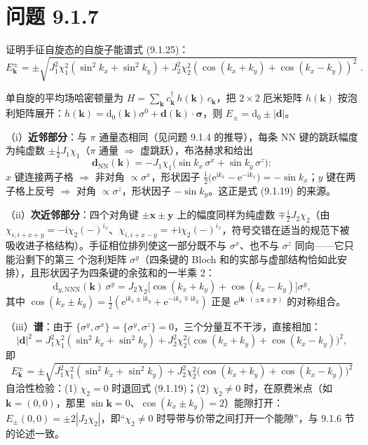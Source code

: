 \section*{问题 9.1.7}
\begin{problem}
证明手征自旋态的自旋子能谱式 (9.1.25)：
\begin{equation*}
E^{\pm}_{\pmb{k}}=\pm\sqrt{J_1^2\chi_1^2(\sin^2k_x+\sin^2k_y)+J_2^2\chi_2^2(\cos(k_x+k_y)+\cos(k_x-k_y))^2}\;.
\end{equation*}
\end{problem}
\solution
单自旋的平均场哈密顿量为 $H=\sum_{\pmb{k}}c^{\dagger}_{\pmb{k}}\,h(\pmb{k})\,c_{\pmb{k}}$，把 $2\times2$ 厄米矩阵 $h(\pmb{k})$ 按泡利矩阵展开：$h(\pmb{k})=\mathrm{d}_0(\pmb{k})\sigma^0+\pmb{d}(\pmb{k})\cdot\pmb{\sigma}$，则 $E_{\pm}=\mathrm{d}_0\pm|\pmb{d}|$。

（i）\textbf{近邻部分}：与 $\pi$ 通量态相同（见问题 9.1.4 的推导），每条 NN 键的跳跃幅度为纯虚数 $\pm\frac{\mathrm{i}}{2}J_1\chi_1$（$\pi$ 通量 $\Rightarrow$ 虚跳跃），布洛赫求和给出
\begin{equation*}
\pmb{d}_{\text{NN}}(\pmb{k})=-J_1\chi_1\big(\sin k_x\,\sigma^x+\sin k_y\,\sigma^z\big) :
\end{equation*}
$x$ 键连接两子格 $\Rightarrow$ 非对角 $\propto\sigma^x$，形状因子 $\frac{\mathrm{i}}{2}\big(\mathrm{e}^{\mathrm{i}k_x}-\mathrm{e}^{-\mathrm{i}k_x}\big)=-\sin k_x$；$y$ 键在两子格上反号 $\Rightarrow$ 对角 $\propto\sigma^z$，形状因子 $-\sin k_y$。这正是式 (9.1.19) 的来源。

（ii）\textbf{次近邻部分}：四个对角键 $\pm\pmb{x}\pm\pmb{y}$ 上的幅度同样为纯虚数 $\mp\frac{\mathrm{i}}{2}J_2\chi_2$（由 $\chi_{i,i+x+y}=-\mathrm{i}\chi_2(-)^{i_x}$、$\chi_{i,i+x-y}=+\mathrm{i}\chi_2(-)^{i_x}$，符号交错在适当的规范下被吸收进子格结构）。手征相位排列使这一部分既不与 $\sigma^x$、也不与 $\sigma^z$ 同向——它只能沿剩下的第三 个泡利矩阵 $\sigma^y$（四条键的 Bloch 和的实部与虚部结构恰如此安排），且形状因子为四条键的余弦和的一半乘 2：
\begin{equation*}
\mathrm{d}_{y,\text{NNN}}(\pmb{k})\,\sigma^y
=J_2\chi_2\big[\cos(k_x+k_y)+\cos(k_x-k_y)\big]\sigma^y ,
\end{equation*}
其中 $\cos(k_x\pm k_y)=\frac12(\mathrm{e}^{\mathrm{i}k_x\pm\mathrm{i}k_y}+\mathrm{e}^{-\mathrm{i}k_x\mp\mathrm{i}k_y})$ 正是 $\mathrm{e}^{\mathrm{i}\pmb{k}\cdot(\pm\pmb{x}\pm\pmb{y})}$ 的对称组合。

（iii）\textbf{谱}：由于 $\{\sigma^y,\sigma^x\}=\{\sigma^y,\sigma^z\}=0$，三个分量互不干涉，直接相加：
\begin{equation*}
|\pmb{d}|^{2}=J_1^{2}\chi_1^{2}(\sin^{2}k_x+\sin^{2}k_y)
+J_2^{2}\chi_2^{2}\big(\cos(k_x+k_y)+\cos(k_x-k_y)\big)^{2} ,
\end{equation*}
即
\begin{equation*}
\boxed{\;E^{\pm}_{\pmb{k}}=\pm\sqrt{J_1^{2}\chi_1^{2}(\sin^{2}k_x+\sin^{2}k_y)
+J_2^{2}\chi_2^{2}\big(\cos(k_x+k_y)+\cos(k_x-k_y)\big)^{2}}\;}
\end{equation*}
自洽性检验：(1) $\chi_2=0$ 时退回式 (9.1.19)；(2) $\chi_2\neq0$ 时，在原费米点（如 $\pmb{k}=(0,0)$，那里 $\sin\pmb{k}=0$、$\cos(k_x\pm k_y)=2$）能隙打开：$E_{\pm}(0,0)=\pm2|J_2\chi_2|$，即“$\chi_2\neq0$ 时导带与价带之间打开一个能隙”，与 9.1.6 节的论述一致。

